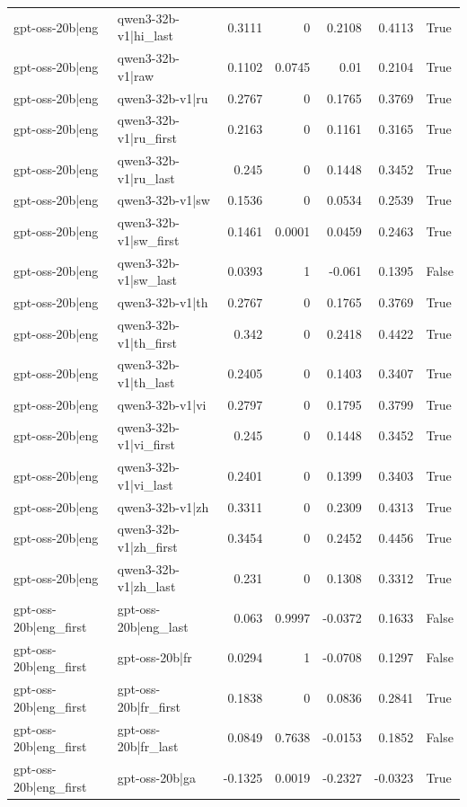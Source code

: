 \begin{table}
\begin{tabular}{l l r r r r l}
gpt-oss-20b|eng & qwen3-32b-v1|hi_last & 0.3111 & 0 & 0.2108 & 0.4113 & True \\
gpt-oss-20b|eng & qwen3-32b-v1|raw & 0.1102 & 0.0745 & 0.01 & 0.2104 & True \\
gpt-oss-20b|eng & qwen3-32b-v1|ru & 0.2767 & 0 & 0.1765 & 0.3769 & True \\
gpt-oss-20b|eng & qwen3-32b-v1|ru_first & 0.2163 & 0 & 0.1161 & 0.3165 & True \\
gpt-oss-20b|eng & qwen3-32b-v1|ru_last & 0.245 & 0 & 0.1448 & 0.3452 & True \\
gpt-oss-20b|eng & qwen3-32b-v1|sw & 0.1536 & 0 & 0.0534 & 0.2539 & True \\
gpt-oss-20b|eng & qwen3-32b-v1|sw_first & 0.1461 & 0.0001 & 0.0459 & 0.2463 & True \\
gpt-oss-20b|eng & qwen3-32b-v1|sw_last & 0.0393 & 1 & -0.061 & 0.1395 & False \\
gpt-oss-20b|eng & qwen3-32b-v1|th & 0.2767 & 0 & 0.1765 & 0.3769 & True \\
gpt-oss-20b|eng & qwen3-32b-v1|th_first & 0.342 & 0 & 0.2418 & 0.4422 & True \\
gpt-oss-20b|eng & qwen3-32b-v1|th_last & 0.2405 & 0 & 0.1403 & 0.3407 & True \\
gpt-oss-20b|eng & qwen3-32b-v1|vi & 0.2797 & 0 & 0.1795 & 0.3799 & True \\
gpt-oss-20b|eng & qwen3-32b-v1|vi_first & 0.245 & 0 & 0.1448 & 0.3452 & True \\
gpt-oss-20b|eng & qwen3-32b-v1|vi_last & 0.2401 & 0 & 0.1399 & 0.3403 & True \\
gpt-oss-20b|eng & qwen3-32b-v1|zh & 0.3311 & 0 & 0.2309 & 0.4313 & True \\
gpt-oss-20b|eng & qwen3-32b-v1|zh_first & 0.3454 & 0 & 0.2452 & 0.4456 & True \\
gpt-oss-20b|eng & qwen3-32b-v1|zh_last & 0.231 & 0 & 0.1308 & 0.3312 & True \\
gpt-oss-20b|eng_first & gpt-oss-20b|eng_last & 0.063 & 0.9997 & -0.0372 & 0.1633 & False \\
gpt-oss-20b|eng_first & gpt-oss-20b|fr & 0.0294 & 1 & -0.0708 & 0.1297 & False \\
gpt-oss-20b|eng_first & gpt-oss-20b|fr_first & 0.1838 & 0 & 0.0836 & 0.2841 & True \\
gpt-oss-20b|eng_first & gpt-oss-20b|fr_last & 0.0849 & 0.7638 & -0.0153 & 0.1852 & False \\
gpt-oss-20b|eng_first & gpt-oss-20b|ga & -0.1325 & 0.0019 & -0.2327 & -0.0323 & True \\

\end{tabular}
\end{table}
